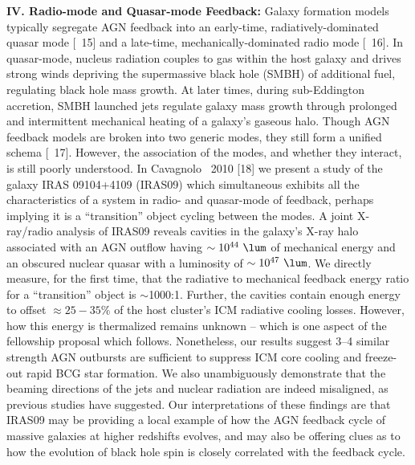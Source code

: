 \documentclass[letterpaper,11pt]{article}
\begin{document}
{\bf{IV. Radio-mode and Quasar-mode Feedback:}} Galaxy formation
models typically segregate AGN feedback into an early-time,
radiatively-dominated quasar mode [\eg\ 15] and a late-time,
mechanically-dominated radio mode [\eg\ 16]. In quasar-mode, nucleus
radiation couples to gas within the host galaxy and drives strong
winds depriving the supermassive black hole (SMBH) of additional fuel,
regulating black hole mass growth. At later times, during
sub-Eddington accretion, SMBH launched jets regulate galaxy mass
growth through prolonged and intermittent mechanical heating of a
galaxy's gaseous halo. Though AGN feedback models are broken into two
generic modes, they still form a unified schema [\eg\ 17]. However,
the association of the modes, and whether they interact, is still
poorly understood. In Cavagnolo \etal\ 2010 [18] we present a study of
the galaxy IRAS 09104+4109 (IRAS09) which simultaneous exhibits all
the characteristics of a system in radio- and quasar-mode of feedback,
perhaps implying it is a ``transition'' object cycling between the
modes. A joint X-ray/radio analysis of IRAS09 reveals cavities in the
galaxy's X-ray halo associated with an AGN outflow having $\sim
10^{44} ~\lum$ of mechanical energy and an obscured nuclear quasar
with a luminosity of $\sim 10^{47} ~\lum$. We directly measure, for
the first time, that the radiative to mechanical feedback energy ratio
for a ``transition'' object is $\sim$1000:1. Further, the cavities
contain enough energy to offset $\approx 25-35\%$ of the host
cluster's ICM radiative cooling losses. However, how this energy is
thermalized remains unknown -- which is one aspect of the fellowship
proposal which follows. Nonetheless, our results suggest 3--4 similar
strength AGN outbursts are sufficient to suppress ICM core cooling and
freeze-out rapid BCG star formation. We also unambiguously demonstrate
that the beaming directions of the jets and nuclear radiation are
indeed misaligned, as previous studies have suggested. Our
interpretations of these findings are that IRAS09 may be providing a
local example of how the AGN feedback cycle of massive galaxies at
higher redshifts evolves, and may also be offering clues as to how the
evolution of black hole spin is closely correlated with the feedback
cycle.
\end{document}
